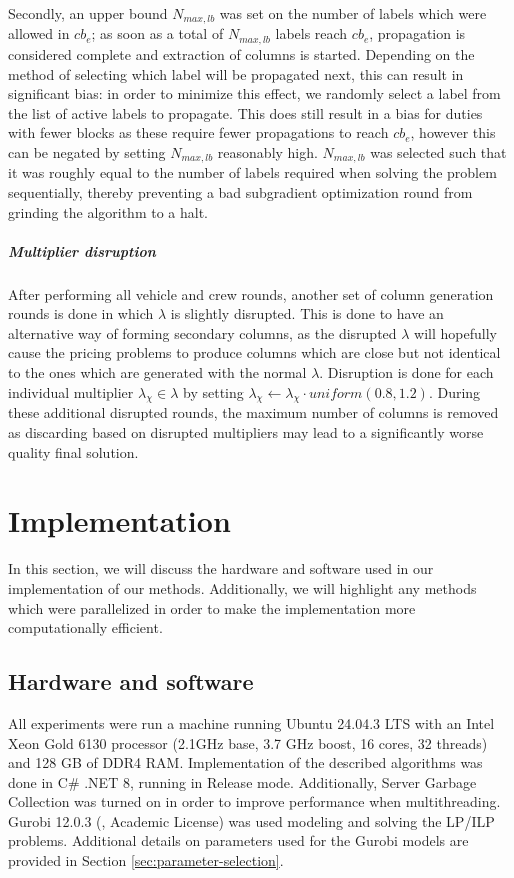 \documentclass[]{article}
\begin{document}
Secondly, an upper bound $N_{max,lb}$ was set on the number of labels which were allowed in $cb_e$; as soon as a total of $N_{max,lb}$ labels reach $cb_e$, propagation is considered complete and extraction of columns is started. Depending on the method of selecting which label will be propagated next, this can result in significant bias: in order to minimize this effect, we randomly select a label from the list of active labels to propagate. This does still result in a bias for duties with fewer blocks as these require fewer propagations to reach $cb_e$, however this can be negated by setting $N_{max,lb}$ reasonably high. $N_{max,lb}$ was selected such that it was roughly equal to the number of labels required when solving the problem sequentially, thereby preventing a bad subgradient optimization round from grinding the algorithm to a halt.

\subparagraph{Multiplier disruption} After performing all vehicle and crew rounds, another set of column generation rounds is done in which $\lambda$ is slightly disrupted. This is done to have an alternative way of forming secondary columns, as the disrupted $\lambda$ will hopefully cause the pricing problems to produce columns which are close but not identical to the ones which are generated with the normal $\lambda$. Disruption is done for each individual multiplier $\lambda_\chi \in \lambda$ by setting $\lambda_\chi \gets \lambda_\chi \cdot \textit{uniform}(0.8,1.2)$. During these additional disrupted rounds, the maximum number of columns is removed as discarding based on disrupted multipliers may lead to a significantly worse quality final solution. 

\section{Implementation}
In this section, we will discuss the hardware and software used in our implementation of our methods. Additionally, we will highlight any methods which were parallelized in order to make the implementation more computationally efficient. 

\subsection{Hardware and software}
All experiments were run a machine running Ubuntu 24.04.3 LTS with an Intel Xeon Gold 6130 processor (2.1GHz base, 3.7 GHz boost, 16 cores, 32 threads) and 128 GB of DDR4 RAM.  Implementation of the described algorithms was done in C\# .NET 8, running in Release mode. Additionally, Server Garbage Collection was turned on in order to improve performance when multithreading. Gurobi 12.0.3 (\citet{Gurobi2025}, Academic License) was used modeling and solving the LP/ILP problems. Additional details on parameters used for the Gurobi models are provided in Section \ref{sec:parameter-selection}.
\end{document}
